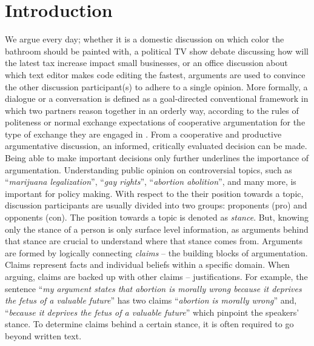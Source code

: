 \chapter{Introduction}

We argue every day; whether it is a domestic discussion on which color the
bathroom should be painted with, a political TV show debate discussing how will
the latest tax increase impact small businesses, or an office discussion about
which text editor makes code editing the fastest, arguments are used to
convince the other discussion participant(s) to adhere to a single opinion.
More formally, a dialogue or a conversation is defined as a goal-directed
conventional framework in which two partners reason 
together in an orderly way, 
according to the rules of politeness or normal exchange expectations
of cooperative argumentation for the type of exchange they are
engaged in \citep{walton1998new}. 
From a cooperative and productive argumentative discussion, 
an informed, critically evaluated decision can be made. 
Being able to make important decisions only further 
underlines the importance of argumentation. 
Understanding public opinion on controversial topics, such as 
``\textit{marijuana legalization}'', ``\textit{gay rights}'', 
``\textit{abortion abolition}'', and many more, is important for
policy making. 
With respect to the their position towards a topic, 
discussion participants are usually divided into two groups: 
proponents (pro) and opponents (con). The position towards a topic is denoted as
\emph{stance}. But, knowing only the stance of a person
is only surface level information, as arguments behind that stance are
crucial to understand where that stance comes from. Arguments
are formed by logically connecting \emph{claims} -- the building blocks of argumentation. 
Claims represent facts and
individual beliefs within a specific domain. When arguing, claims are backed up
with other claims -- justifications. For example, the sentence ``\emph{my
argument states that abortion is morally wrong because it deprives the fetus of
a valuable future}'' has two claims ``\emph{abortion is morally wrong}'' and,
``\emph{because it deprives the fetus of a valuable future}'' which pinpoint
the speakers' stance.  To determine claims behind a certain  stance, it is
often required to go beyond written text. 


